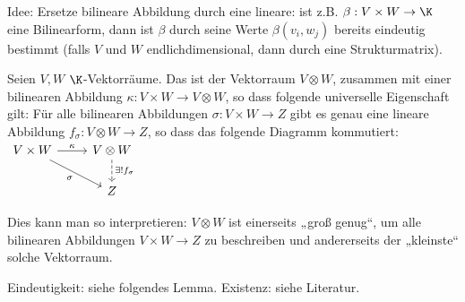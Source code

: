 

Idee: Ersetze bilineare Abbildung durch eine lineare: ist z.B. $\beta: V \times W \to \K$ eine Bilinearform, dann ist $\beta$ durch seine Werte $\beta(v_i, w_j)$ bereits eindeutig bestimmt (falls $V$ und $W$ endlichdimensional, dann durch eine Strukturmatrix).

\begin{df} \label{5.10}
    Seien $V, W$ $\K$-Vektorräume.
    Das  ist der Vektorraum $V \otimes W$, zusammen mit einer bilinearen Abbildung $\kappa: V \times W \to V \otimes W$, so dass folgende universelle Eigenschaft gilt:
    Für alle bilinearen Abbildungen $\sigma: V \times W \to Z$ gibt es genau eine lineare Abbildung $f_\sigma: V \otimes W \to Z$, so dass das folgende Diagramm kommutiert:
    \begin{math}
        \begin{tikzcd}
            V \times W \ar[r,"\kappa"] \ar[rd,"\sigma"'] & V \otimes W \ar[d,"\exists! f_\sigma",dashed] \\
            & Z
        \end{tikzcd}
    \end{math}
    \begin{note}
        Dies kann man so interpretieren: $V \otimes W$ ist einerseits „groß genug“, um alle bilinearen Abbildungen $V \times W \to Z$ zu beschreiben und andererseits der „kleinste“ solche Vektorraum.

        Eindeutigkeit: siehe folgendes Lemma.
        Existenz: siehe Literatur.
    \end{note}
\end{df}


